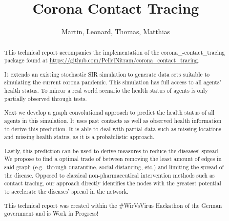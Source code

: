 \documentclass[]{article}
\title{Corona Contact Tracing}
\author{Martin, Leonard, Thomas, Matthias}
\begin{document}
\maketitle

\begin{abstract}
	This technical report accompanies the implementation of the corona\_-contact\_tracing package found at \url{https://github.com/PellelNitram/corona_contact_tracing}.

	It extends an existing stochastic SIR simulation to generate data sets suitable to simulating the current corona pandemic.
	This simulation has full access to all agents' health status.
	To mirror a real world scenario the health status of agents is only partially observed through tests.

	Next we develop a graph convolutional approach to predict the health status of all agents in this simulation.
	It uses past contacts as well as observed health information to derive this prediction.
	It is able to deal with partial data such as missing locations and missing health status, as it is a probabilistic approach.
	
	Lastly, this prediction can be used to derive measures to reduce the diseases' spread.
	We propose to find a optimal trade of between removing the least amount of edges in said graph (e.g.\ through quarantine, social distancing, etc.) and limiting the spread of the disease.
	Opposed to classical non-pharmaceutical intervention methods such as contact tracing, our approach directly identifies the nodes with the greatest potential to accelerate the diseases' spread in the network.
	
	This technical report was created within the \#WirVsVirus Hackathon of the German government and is Work in Progress!
\end{abstract}








\printbibliography{}
\end{document}
